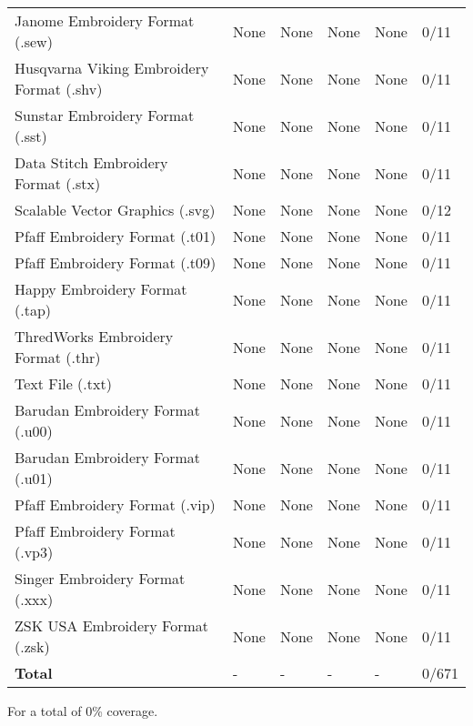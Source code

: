 \begin{longtable}{p{5cm} p{1.5cm} p{1.5cm} p{1.5cm} l l}
Janome Embroidery Format (.sew) & None & None & None & None & 0/11 \\
Husqvarna Viking Embroidery Format (.shv) & None & None & None & None & 0/11 \\
Sunstar Embroidery Format (.sst) & None & None & None & None & 0/11 \\
Data Stitch Embroidery Format (.stx) & None & None & None & None & 0/11 \\
Scalable Vector Graphics (.svg) & None & None & None & None & 0/12 \\
Pfaff Embroidery Format (.t01) & None & None & None & None & 0/11 \\
Pfaff Embroidery Format (.t09) & None & None & None & None & 0/11 \\
Happy Embroidery Format (.tap) & None & None & None & None & 0/11 \\
ThredWorks Embroidery Format (.thr) & None & None & None & None & 0/11 \\
Text File (.txt) & None & None & None & None & 0/11 \\
Barudan Embroidery Format (.u00) & None & None & None & None & 0/11 \\
Barudan Embroidery Format (.u01) & None & None & None & None & 0/11 \\
Pfaff Embroidery Format (.vip) & None & None & None & None & 0/11 \\
Pfaff Embroidery Format (.vp3) & None & None & None & None & 0/11 \\
Singer Embroidery Format (.xxx) & None & None & None & None & 0/11 \\
ZSK USA Embroidery Format (.zsk) & None & None & None & None & 0/11 \\
\textbf{Total} & - & - & - & - & 0/671
\end{longtable}

For a total of 0\% coverage.